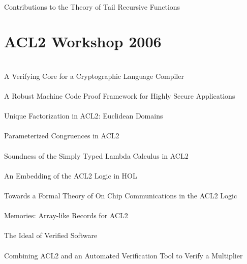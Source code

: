 \documentclass{article}
\begin{document}
\cite{04-cowles-tail} \\
Contributions to the Theory of Tail Recursive Functions \\


\section{ACL2 Workshop 2006}

\cite{06-pike-cryptol} \\
A Verifying Core for a Cryptographic Language Compiler \\

\cite{06-hardin-framework} \\
A Robust Machine Code Proof Framework for Highly Secure Applications \\

\cite{06-cowles-factorization} \\
Unique Factorization in {ACL2}: {Euclidean} Domains \\

\cite{06-greve-parameterized} \\
Parameterized Congruences in {ACL2} \\

\cite{06-swords-stlc} \\
Soundness of the Simply Typed Lambda Calculus in {ACL2} \\

\cite{06-gordon-hol} \\
An Embedding of the {ACL2} Logic in {HOL} \\

\cite{06-schmaltz-chip} \\
Towards a Formal Theory of On Chip Communications in the {ACL2} Logic \\

\cite{06-davis-memories} \\
Memories: Array-like Records for {ACL2} \\

\cite{06-hoare-ideal} \\
The Ideal of Verified Software \\

\cite{06-reeber-multiplier} \\
Combining {ACL2} and an Automated Verification Tool to Verify a Multiplier \\
\end{document}

